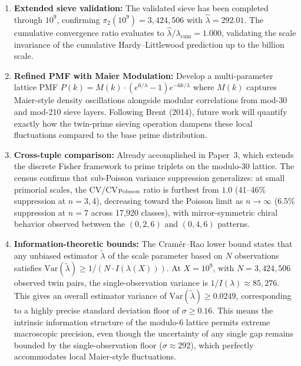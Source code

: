 \documentclass[11pt]{article}
\begin{document}
\begin{enumerate}
    \item \textbf{Extended sieve validation:} The validated sieve has been completed through $10^9$, confirming $\pi_2(10^9) = 3{,}424{,}506$ with $\hat{\lambda} = 292.01$. The cumulative convergence ratio evaluates to $\hat{\lambda}/\lambda_{\text{cum}} = 1.000$, validating the scale invariance of the cumulative Hardy--Littlewood prediction up to the billion scale.
    
    \item \textbf{Refined PMF with Maier Modulation:} Develop a multi-parameter lattice PMF $P(k) = M(k) \cdot (e^{6/\lambda}-1)e^{-6k/\lambda}$ where $M(k)$ captures Maier-style density oscillations alongside modular correlations from mod-30 and mod-210 sieve layers. Following Brent (2014), future work will quantify exactly how the twin-prime sieving operation dampens these local fluctuations compared to the base prime distribution.
    
    \item \textbf{Cross-tuple comparison:} Already accomplished in Paper~3, which extends the discrete Fisher framework to prime triplets on the modulo-30 lattice. The census confirms that sub-Poisson variance suppression generalizes: at small primorial scales, the CV/CV$_{\rm Poisson}$ ratio is furthest from $1.0$ (41--46\% suppression at $n=3,4$), decreasing toward the Poisson limit as $n \to \infty$ (6.5\% suppression at $n=7$ across 17{,}920 classes), with mirror-symmetric chiral behavior observed between the $(0,2,6)$ and $(0,4,6)$ patterns.
    
    \item \textbf{Information-theoretic bounds:} The Cram\'{e}r--Rao lower bound states that any unbiased estimator $\tilde{\lambda}$ of the scale parameter based on $N$ observations satisfies $\text{Var}(\tilde{\lambda}) \geq 1/(N \cdot I(\lambda(X)))$.
At $X = 10^9$, with $N = 3{,}424{,}506$ observed twin pairs, the single-observation variance is $1/I(\lambda) \approx 85{,}276$. This gives an overall estimator variance of $\text{Var}(\tilde{\lambda}) \geq 0.0249$, corresponding to a highly precise standard deviation floor of $\sigma \geq 0.16$.
This means the intrinsic information structure of the modulo-6 lattice permits extreme macroscopic precision, even though the uncertainty of any single gap remains bounded by the single-observation floor ($\sigma \approx 292$), which perfectly accommodates local Maier-style fluctuations.
\end{enumerate}
\end{document}
